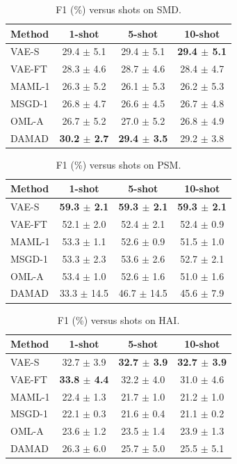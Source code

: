 \begin{table}[t]
\centering
\small
\caption{F1 (\%) versus shots on SMD.}
\label{tab:shots_smd}
\begin{tabular}{lccc}
\toprule
Method & 1-shot & 5-shot & 10-shot \\
\midrule
VAE-S & 29.4 $\pm$ 5.1 & 29.4 $\pm$ 5.1 & \textbf{29.4 $\pm$ 5.1} \\
VAE-FT & 28.3 $\pm$ 4.6 & 28.7 $\pm$ 4.6 & 28.4 $\pm$ 4.7 \\
MAML-1 & 26.3 $\pm$ 5.2 & 26.1 $\pm$ 5.3 & 26.2 $\pm$ 5.3 \\
MSGD-1 & 26.8 $\pm$ 4.7 & 26.6 $\pm$ 4.5 & 26.7 $\pm$ 4.8 \\
OML-A & 26.7 $\pm$ 5.2 & 27.0 $\pm$ 5.2 & 26.8 $\pm$ 4.9 \\
DAMAD & \textbf{30.2 $\pm$ 2.7} & \textbf{29.4 $\pm$ 3.5} & 29.2 $\pm$ 3.8 \\
\bottomrule
\end{tabular}
\end{table}

\begin{table}[t]
\centering
\small
\caption{F1 (\%) versus shots on PSM.}
\label{tab:shots_psm}
\begin{tabular}{lccc}
\toprule
Method & 1-shot & 5-shot & 10-shot \\
\midrule
VAE-S & \textbf{59.3 $\pm$ 2.1} & \textbf{59.3 $\pm$ 2.1} & \textbf{59.3 $\pm$ 2.1} \\
VAE-FT & 52.1 $\pm$ 2.0 & 52.4 $\pm$ 2.1 & 52.4 $\pm$ 0.9 \\
MAML-1 & 53.3 $\pm$ 1.1 & 52.6 $\pm$ 0.9 & 51.5 $\pm$ 1.0 \\
MSGD-1 & 53.3 $\pm$ 2.3 & 53.6 $\pm$ 2.6 & 52.7 $\pm$ 2.1 \\
OML-A & 53.4 $\pm$ 1.0 & 52.6 $\pm$ 1.6 & 51.0 $\pm$ 1.6 \\
DAMAD & 33.3 $\pm$ 14.5 & 46.7 $\pm$ 14.5 & 45.6 $\pm$ 7.9 \\
\bottomrule
\end{tabular}
\end{table}

\begin{table}[t]
\centering
\small
\caption{F1 (\%) versus shots on HAI.}
\label{tab:shots_hai}
\begin{tabular}{lccc}
\toprule
Method & 1-shot & 5-shot & 10-shot \\
\midrule
VAE-S & 32.7 $\pm$ 3.9 & \textbf{32.7 $\pm$ 3.9} & \textbf{32.7 $\pm$ 3.9} \\
VAE-FT & \textbf{33.8 $\pm$ 4.4} & 32.2 $\pm$ 4.0 & 31.0 $\pm$ 4.6 \\
MAML-1 & 22.4 $\pm$ 1.3 & 21.7 $\pm$ 1.0 & 21.2 $\pm$ 1.0 \\
MSGD-1 & 22.1 $\pm$ 0.3 & 21.6 $\pm$ 0.4 & 21.1 $\pm$ 0.2 \\
OML-A & 23.6 $\pm$ 1.2 & 23.5 $\pm$ 1.4 & 23.9 $\pm$ 1.3 \\
DAMAD & 26.3 $\pm$ 6.0 & 25.7 $\pm$ 5.0 & 25.5 $\pm$ 5.1 \\
\bottomrule
\end{tabular}
\end{table}

